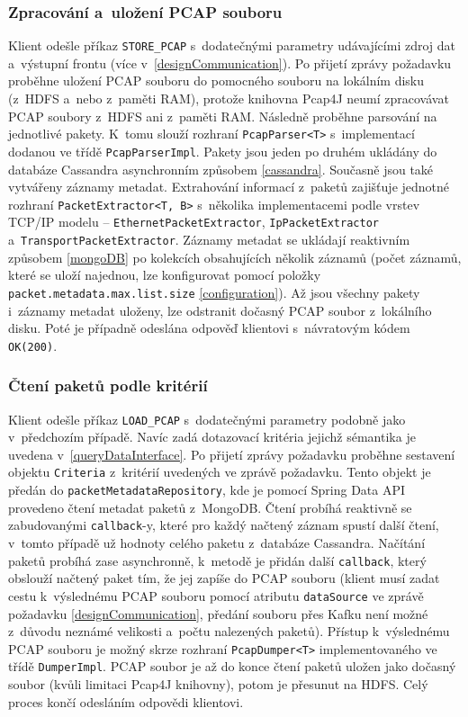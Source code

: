 \subsubsection{Zpracování a~uložení PCAP souboru}
Klient odešle příkaz \texttt{STORE\_PCAP} s~dodatečnými parametry udávajícími zdroj dat a~výstupní frontu (více v~\ref{designCommunication}). Po přijetí zprávy požadavku proběhne uložení PCAP souboru do pomocného souboru na lokálním disku (z~HDFS a~nebo z~paměti RAM), protože knihovna Pcap4J neumí zpracovávat PCAP soubory z~HDFS ani z~paměti RAM. Následně proběhne parsování na jednotlivé pakety. K~tomu slouží rozhraní \texttt{PcapParser<T>} s~implementací dodanou ve třídě \texttt{PcapParserImpl}. Pakety jsou jeden po druhém ukládány do databáze Cassandra asynchronním způsobem \ref{cassandra}. Současně jsou také vytvářeny záznamy metadat. Extrahování informací z~paketů zajišťuje jednotné rozhraní \texttt{PacketExtractor<T, B>} s~několika implementacemi podle vrstev TCP/IP modelu -- \texttt{EthernetPacketExtractor}, \texttt{IpPacketExtractor} a~\texttt{TransportPacketExtractor}. Záznamy metadat se ukládají reaktivním způsobem \ref{mongoDB} po kolekcích obsahujících několik záznamů (počet záznamů, které se uloží najednou, lze konfigurovat pomocí položky \texttt{packet.metadata.max.list.size} \ref{configuration}). Až jsou všechny pakety i~záznamy metadat uloženy, lze odstranit dočasný PCAP soubor z~lokálního disku. Poté je případně odeslána odpověď klientovi s~návratovým kódem \texttt{OK(200)}.

\subsubsection{Čtení paketů podle kritérií}
Klient odešle příkaz \texttt{LOAD\_PCAP} s~dodatečnými parametry podobně jako v~předchozím případě. Navíc zadá dotazovací kritéria jejichž sémantika je uvedena v~\ref{queryDataInterface}. Po přijetí zprávy požadavku proběhne sestavení objektu \texttt{Criteria} z~kritérií uvedených ve zprávě požadavku. Tento objekt je předán do \texttt{packetMetadataRepository}, kde je pomocí Spring Data API provedeno čtení metadat paketů z~MongoDB. Čtení probíhá reaktivně se zabudovanými \texttt{callback}-y, které pro každý načtený záznam spustí další čtení, v~tomto případě už hodnoty celého paketu z~databáze Cassandra. Načítání paketů probíhá zase asynchronně, k~metodě je přidán další \texttt{callback}, který obslouží načtený paket tím, že jej zapíše do PCAP souboru (klient musí zadat cestu k~výslednému PCAP souboru pomocí atributu \texttt{dataSource} ve zprávě požadavku \ref{designCommunication}, předání souboru přes Kafku není možné z~důvodu neznámé velikosti a~počtu nalezených paketů). Přístup k~výslednému PCAP souboru je možný skrze rozhraní \texttt{PcapDumper<T>} implementovaného ve třídě \texttt{DumperImpl}. PCAP soubor je až do konce čtení paketů uložen jako dočasný soubor (kvůli limitaci Pcap4J knihovny), potom je přesunut na HDFS. Celý proces končí odesláním odpovědi klientovi.

